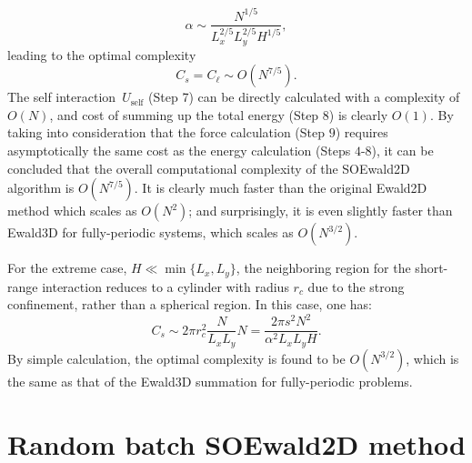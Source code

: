 \begin{equation}
	\alpha \sim \frac{N^{1/5}}{L_x^{2/5}L_y^{2/5}H^{1/5}},
\end{equation}
leading to the optimal complexity
\begin{equation}\label{eq::70}
	C_{s} = C_{\ell} \sim O(N^{7/5}).
\end{equation}
The self interaction~$U_{\text{self}}$ (Step 7) can be directly calculated with a complexity of $O(N)$, and cost of summing up the total energy (Step 8) is clearly $O(1)$.
By taking into consideration that the force calculation (Step $9$) requires asymptotically the same cost as the energy calculation (Steps $4$-$8$), it can be concluded that the overall computational complexity of the SOEwald2D algorithm is $O(N^{7/5})$. 
It is clearly much faster than the original Ewald2D method which scales as $O(N^{2})$; and surprisingly, it is even slightly faster than Ewald3D for fully-periodic systems, which scales as $O(N^{3/2})$.

\begin{rmk}\label{rmk::extreme}
	For the extreme case, $H \ll \min\{L_x,L_y\}$, the neighboring region for the short-range interaction reduces to a cylinder with radius $r_c$ due to the strong confinement, rather than a spherical region. 
	In this case, one has:
	\begin{equation}
		C_{s}\sim 2\pi r_c^2 \frac{N}{L_x L_y} N=\frac{2\pi s^2N^2}{\alpha^2L_x L_y H}.
	\end{equation}
	By simple calculation, the optimal complexity is found to be $O(N^{3/2})$, which is the same as that of the Ewald3D summation for fully-periodic problems. 
\end{rmk}


\section{Random batch SOEwald2D method} \label{sec:rbm}

